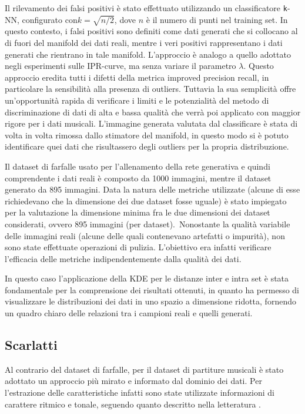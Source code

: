Il rilevamento dei falsi positivi è stato effettuato utilizzando un classificatore \texttt{k}-NN, configurato con ​\(k=\sqrt{n/2}\), dove \(n\) è il numero di punti nel training set. In questo contesto, i falsi positivi sono definiti come dati generati che si collocano al di fuori del manifold dei dati reali, mentre i veri positivi rappresentano i dati generati che rientrano in tale manifold. L’approccio è analogo a quello adottato negli esperimenti sulle IPR-curve, ma senza variare il parametro \(\lambda\). 
Questo approccio eredita tutti i difetti della metrica improved precision recall, in particolare la sensibilità alla presenza di outliers. Tuttavia la sua semplicità offre un'opportunità rapida di verificare i limiti e le potenzialità del metodo di discriminazione di dati di alta e bassa qualità che verrà poi applicato con maggior rigore per i dati musicali.
L'immagine generata valutata dal classificare è stata di volta in volta rimossa dallo stimatore del manifold, in questo modo si è potuto identificare quei dati che risultassero degli outliers per la propria distribuzione.

Il dataset di farfalle usato per l'allenamento della rete generativa e quindi comprendente i dati reali è composto da 1000 immagini, mentre il dataset generato da 895 immagini. Data la natura delle metriche utilizzate (alcune di esse richiedevano che la dimensione dei due dataset fosse uguale) è stato impiegato per la valutazione la dimensione minima fra le due dimensioni dei dataset considerati, ovvero 895 immagini (per dataset).\
Nonostante la qualità variabile delle immagini reali (alcune delle quali contenevano artefatti o impurità), non sono state effettuate operazioni di pulizia. L’obiettivo era infatti verificare l’efficacia delle metriche indipendentemente dalla qualità dei dati.

In questo caso l'applicazione della KDE per le distanze inter e intra set è stata fondamentale per la comprensione dei risultati ottenuti, in quanto ha permesso di visualizzare le distribuzioni dei dati in uno spazio a dimensione ridotta, fornendo un quadro chiaro delle relazioni tra i campioni reali e quelli generati.\

\subsection{Scarlatti}
\label{subsec:scarlatti}

Al contrario del dataset di farfalle, per il dataset di partiture musicali è stato adottato un approccio più mirato e informato dal dominio dei dati. Per l'estrazione delle caratteristiche infatti sono state utilizzate informazioni di carattere ritmico e tonale, seguendo quanto descritto nella letteratura \cite{8OnTheEvaluationOfGenerativeModelsInMusic}.\

